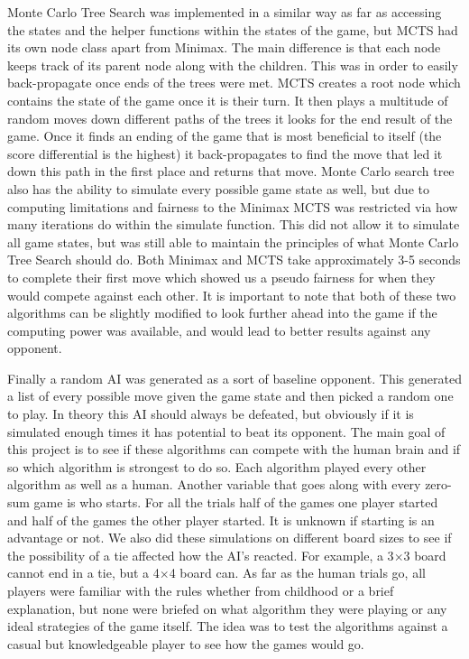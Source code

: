 \documentclass[12pt]{article}
\begin{document}
    Monte Carlo Tree Search was implemented in a similar way as far as accessing the states and the helper functions within the states of the game, but MCTS had its own node class apart from Minimax. The main difference is that each node keeps track of its parent node along with the children. This was in order to easily back-propagate once ends of the trees were met. MCTS creates a root node which contains the state of the game once it is their turn. It then plays a multitude of random moves down different paths of the trees it looks for the end result of the game. Once it finds an ending of the game that is most beneficial to itself (the score differential is the highest) it back-propagates to find the move that led it down this path in the first place and returns that move. Monte Carlo search tree also has the ability to simulate every possible game state as well, but due to computing limitations and fairness to the Minimax MCTS was restricted via how many iterations do within the simulate function. This did not allow it to simulate all game states, but was still able to maintain the principles of what Monte Carlo Tree Search should do. Both Minimax and MCTS take approximately 3-5 seconds to complete their first move which showed us a pseudo fairness for when they would compete against each other. It is important to note that both of these two algorithms can be slightly modified to look further ahead into the game if the computing power was available, and would lead to better results against any opponent.

    Finally a random AI was generated as a sort of baseline opponent. This generated a list of every possible move given the game state and then picked a random one to play. In theory this AI should always be defeated, but obviously if it is simulated enough times it has potential to beat its opponent. The main goal of this project is to see if these algorithms can compete with the human brain and if so which algorithm is strongest to do so. Each algorithm played every other algorithm as well as a human. Another variable that goes along with every zero-sum game is who starts. For all the trials half of the games one player started and half of the games the other player started. It is unknown if starting is an advantage or not. We also did these simulations on different board sizes to see if the possibility of a tie affected how the AI’s reacted. For example, a 3\(\times\)3 board cannot end in a tie, but a 4\(\times\)4 board can. As far as the human trials go, all players were familiar with the rules whether from childhood or a brief explanation, but none were briefed on what algorithm they were playing or any ideal strategies of the game itself. The idea was to test the algorithms against a casual but knowledgeable player to see how the games would go. 
\end{document}

